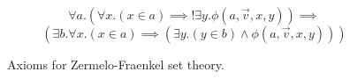 \begin{figure}
\begin{axzf}\label{axzf:replacement}
$$\forall a. (\forall x. (x \in a) \implies !\exists y. \phi(a, \vec{v}, x, y)) \implies $$
$$(\exists b. \forall x. (x \in a) \implies (\exists y. (y \in b) \land \phi(a, \vec{v}, x, y)))$$
\end{axzf}
\caption{Axioms for Zermelo-Fraenkel set theory.}
\label{fig:axiomszf}
\end{figure}



